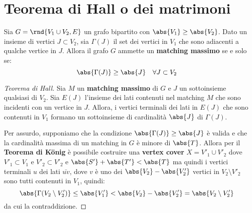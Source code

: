 \documentclass[\main/main.tex]{subfiles}
\begin{document}
\section{Teorema di Hall o dei matrimoni}
\begin{theorem}
  Sia \(G = \rnd{V_1 \cup V_2, E}\) un grafo bipartito con \(\abs{V_1} \geq \abs{V_2}\). Dato un insieme di vertici \(J \subset V_2\), sia \(\Gamma(J) \) il set dei vertici in \(V_1\) che sono adiacenti a qualche vertice in \(J\). Allora il grafo \(G\) ammette un \textbf{matching massimo} se e solo se:
  \[
    \abs{\Gamma(J)} \geq \abs{J} \quad \forall J \subset V_2
  \]
\end{theorem}

\begin{proof}[Teorema di Hall]
  Sia \(M\) un \textbf{matching massimo} di \(G\) e \(J\) un sottoinsieme qualsiasi di \(V_2\). Sia \(E(J)\) l'insieme dei lati contenuti nel matching \(M\) che sono incidenti con un vertice in \(J\). Allora, i vertici terminali dei lati in \(E(J)\) che sono contenuti in \(V_1\) formano un sottoinsieme di cardinalità \(\abs{J}\) di \(\Gamma(J)\).

  Per assurdo, supponiamo che la condizione \(\abs{\Gamma(J)} \geq \abs{J}\) è valida e che la cardinalità massima di un matching in \(G\) è minore di \(\abs{T}\). Allora per il \textbf{Teorema di König} è possibile costruire una \textbf{vertex cover} \(X=V'_1 \cup V'_2\) dove \(V'_1 \subset V_1\) e \(V'_2 \subset V'_2\) e \(\abs{S'} + \abs{T'} < \abs{T}\) ma quindi i vertici terminali \(u\) dei lati \(\bar{uv}\), dove \(v\) è uno dei \(\abs{V_2} - \abs{V'_2}\) vertici in \(V_2\setminus V'_2\) sono tutti contenuti in \(V_1\), quindi:
  \[
    \abs{\Gamma(V_2\setminus V'_2)} \leq \abs{V'_1} < \abs{V_2} - \abs{V'_2} = \abs{V_2\setminus V'_2}
  \]
  da cui la contraddizione.
\end{proof}
\end{document}
